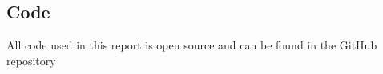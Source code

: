 \documentclass{article}
\theoremstyle{definition}
\numberwithin{equation}{section}
\begin{document}
\subsection{Code}
\label{sec:code}

All code used in this report is open source and can be found in the GitHub repository \cite{github}
\end{document}
